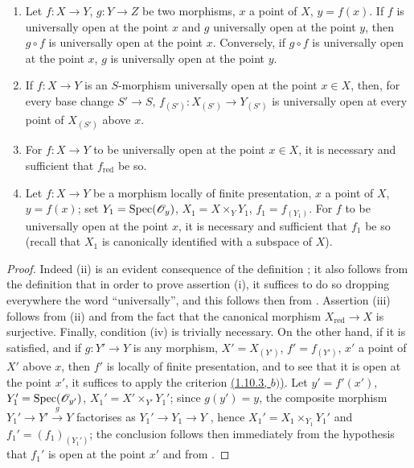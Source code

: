 \begin{proposition}[14.3.4]
\label{IV.14.3.4}
\begin{enumerate}[label=(\roman*)]
  \item Let $f:X\to Y$, $g:Y\to Z$ be two morphisms, $x$ a point of $X$, $y=f(x)$.
  If $f$ is universally open at the point $x$ and $g$ universally open at the point $y$, then $g\circ f$ is universally open at the point $x$.
  Conversely, if $g\circ f$ is universally open at the point $x$, $g$ is universally open at the point $y$.

  \item If $f:X\to Y$ is an $S$-morphism universally open at the point $x\in X$, then, for every base change $S'\to S$, $f_{(S')}:X_{(S')}\to Y_{(S')}$ is universally open at every point of $X_{(S')}$ above $x$.

  \item For $f:X\to Y$ to be universally open at the point $x\in X$, it is necessary and sufficient that $f_{\mathrm{red}}$ be so.

  \item Let $f:X\to Y$ be a morphism locally of finite presentation, $x$ a point of $X$, $y=f(x)$; set $Y_1=\operatorname{Spec}(\mathscr{O}_y)$, $X_1=X\times_Y Y_1$, $f_1=f_{(Y_1)}$.
  For $f$ to be universally open at the point $x$, it is necessary and sufficient that $f_1$ be so (recall  that $X_1$ is canonically identified with a subspace of $X$).
\end{enumerate}
\end{proposition}

\begin{proof}
Indeed (ii) is an evident consequence of the definition ; it also follows from the definition that in order to prove assertion (i), it suffices to do so dropping everywhere the word ``universally'', and this follows then from .
Assertion (iii) follows from (ii) and from the fact that the canonical morphism $X_{\mathrm{red}}\to X$ is surjective.
Finally, condition (iv) is trivially necessary.
On the other hand, if it is satisfied, and if $g:Y'\to Y$ is any morphism, $X'=X_{(Y')}$, $f'=f_{(Y')}$, $x'$ a point of $X'$ above $x$, then $f'$ is locally of finite presentation, and to see that it is open at the point $x'$, it suffices to apply the criterion {\hyperref[subsection:IV.1.10]{(1.10.3, $b)$)}}.
Let $y'=f'(x')$, $Y_1'=\operatorname{Spec}(\mathscr{O}_{y'})$, $X_1'=X'\times_{Y'}Y_1'$; since $g(y')=y$, the composite morphism $Y_1'\to Y'\xrightarrow{g}Y$ factorises as $Y_1'\to Y_1\to Y$ , hence $X_1'=X_1\times_{Y_1}Y_1'$ and $f_1'=(f_1)_{(Y_1')}$; the conclusion follows then immediately from the hypothesis that $f_1'$ is open at the point $x'$ and from .
\end{proof}

